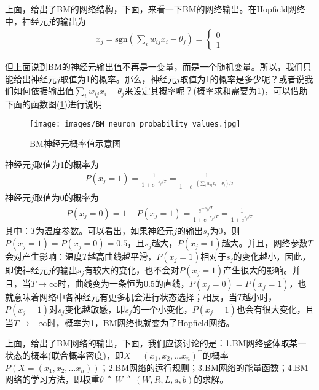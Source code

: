             \par
            上面，给出了BM的网络结构，下面，来看一下BM的网络输出。在Hopfield网络中，神经元$j$的输出为
            \begin{align*}
            x_j = \mathrm{sgn} \left( \sum_{i} w_{ij}x_i - \theta_j \right)  =
            \left\{
            \begin{aligned}
            0\\
            1
            \end{aligned}
            \right.
            \end{align*}
            \par
            但上面说到BM的神经元输出值不再是一变量，而是一个随机变量。所以，我们只能给出神经元$j$取值为1的概率。那么，神经元$j$取值为1的概率是多少呢？或者说我们如何依据输出值$\sum_{i} w_{ij}x_i - \theta_j $来设定其概率呢？(概率求和需要为1)，可以借助下面的函数图(\ref{fig:BM神经元概率值示意图})进行说明
            \begin{figure}[H]
            \centering
            \texttt{[image: images/BM\_neuron\_probability\_values.jpg]}
            \caption{BM神经元概率值示意图}
            \label{fig:BM神经元概率值示意图}
            \end{figure}
            神经元$j$取值为1的概率为
            \begin{align*}
            P(x_j = 1) = \frac{1}{1+e^{-s_j/T}} = \frac{1}{1+e^{-\left( \sum_{i} w_{ij}x_i - \theta_j \right) /T}}
            \end{align*}
            神经元$j$取值为0的概率为
            \begin{align*}
            P(x_j = 0) = 1-P(x_j = 1) = \frac{e^{-s_j/T}}{1+e^{-s_j/T}} = \frac{1}{1+e^{s_j/T}}
            \end{align*}
            其中：$T$为温度参数。可以看出，如果神经元$j$的输出$s_j$为0，则$P(x_j=1) = P(x_j=0) = 0.5$，且$s_j$越大，$P(x_j=1)$越大。并且，网络参数$T$会对产生影响：温度$T$越高曲线越平滑，$P(x_j=1)$相对于$s_j$的变化越小，因此，即使神经元$j$的输出$s_j$有较大的变化，也不会对$P(x_j=1)$产生很大的影响。并且，当$T\rightarrow \infty$时，曲线变为一条恒为0.5的直线，$P(x_j=0)=P(x_j=1)$，也就意味着网络中各神经元有更多机会进行状态选择；相反，当$T$越小时，$P(x_j=1)$对$s_j$变化越敏感，即$s_j$的一个小变化，$P(x_j=1)$也会有很大变化，且当$T\rightarrow -\infty$时，概率为1，BM网络也就变为了Hopfield网络。
            \par
            上面，给出了BM网络的输出，下面，我们应该讨论的是：1.BM网络整体取某一状态的概率(联合概率密度)，即$X = (x_1,x_2,\dots x_n)^\mathrm{T}$的概率$P(X =(x_1,x_2,\dots x_n)) $；2.BM网络的运行规则；3.BM网络的能量函数；4.BM网络的学习方法，即权重$\theta \triangleq W \triangleq (W,R,L,a,b)$的求解。

